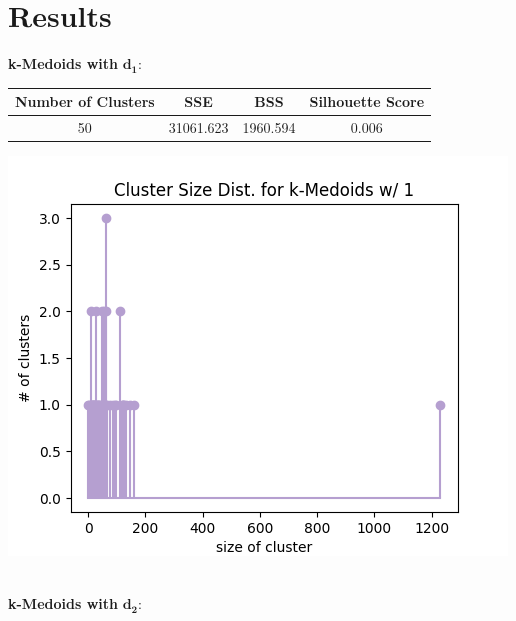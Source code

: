 \documentclass[fleqn]{article}
\begin{document}
\section{Results}
\textbf{k-Medoids with }$\mathbf{d_1}$:\\
\begin{minipage}{0.65\textwidth}
	\begin{tabular}{|c|c|c|c|}
    	\hline
    	\textbf{Number of Clusters} & \textbf{SSE} &\textbf{BSS} &\textbf{Silhouette Score}\\
    	\hline
    	50 & 31061.623 & 1960.594 & 0.006\\
    	\hline
	\end{tabular}
\end{minipage}\begin{minipage}{0.35\textwidth}
	\includegraphics[scale=0.35]{images/size_dist_km_d1.png}
\end{minipage}\\
\textbf{k-Medoids with }$\mathbf{d_2}$:\\
\end{document}
